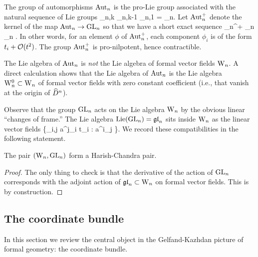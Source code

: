 The group of automorphisms ${\rm Aut}_n$ is the pro-Lie group associated with the natural sequence of Lie groups
\ben
\cdots \to \Aut_{n,k} \to \Aut_{n,k-1} \to \cdots \to \Aut_{n,1} = \GL_n.
\een
Let ${\rm Aut}_n^+$ denote the kernel of the map ${\rm Aut}_n \to {\rm GL}_n$ so that we have a short exact sequence
 \to \Aut_n^+ \to \Aut_n \to \GL_n  .
\een
In other words, for an element $\phi$ of ${\rm Aut}_n^+$, each component
$\phi_i$ is of the form $t_i + \mathcal O(t^2)$. The group ${\rm Aut}_n^+$ is
pro-nilpotent, hence contractible. 

The Lie algebra of ${\rm Aut}_n$ is {\em not} the Lie algebra of formal
vector fields ${{\rm W}_n}$. A direct
calculation shows that the Lie algebra of ${\rm Aut}_n$ is the Lie algebra ${{\rm W}^0_n} \subset {{\rm W}_n}$ of formal vector fields with zero constant coefficient (i.e., that vanish at the origin of $\widehat{D}^n$). 

Observe that the group ${\rm GL}_n$ acts on the Lie algebra ${{\rm W}_n}$ by the obvious linear ``changes of frame.''
The Lie algebra ${\rm Lie}({{\rm GL}_n}) = {\mathfrak{gl}}_n$ sits inside ${{\rm W}_n}$ as the linear vector fields
\ben
\left\{\sum_{i,j} a^j_i t_i  \; : \; a^{i}_j \in \CC \right\}.
\een 
We record these compatibilities in the following statement.

\begin{lem} 
The pair $({{\rm W}_n}, {\rm GL}_n)$ form a Harish-Chandra pair.
\end{lem}
\begin{proof} The only thing to check is that the derivative of the
  action of ${\rm GL}_n$ corresponds with the adjoint action of ${\mathfrak{gl}}_n
  \subset {{\rm W}_n}$ on formal vector fields. This is by construction. 
\end{proof}

\subsection{The coordinate bundle}

In this section we review the central object in the Gelfand-Kazhdan
picture of formal geometry: the coordinate bundle.


